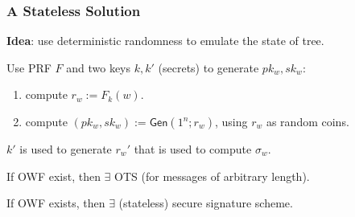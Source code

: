 \begin{comment}
\[ \Pr [\mathsf{Sigforge}_{\mathcal{A},\Pi }^{\text{1-time}}(n)=1] = \Pr [\mathsf{Sigforge}_{\mathcal{A}^*,\Pi^* }(n)=1]/\ell(n)\]
\end{proof}
\end{frame}
\end{comment}
\begin{frame}\frametitle{A Stateless Solution}
\textbf{Idea}: use deterministic randomness to emulate the state of tree.
\newline

Use PRF $F$ and two keys $k,k'$ (secrets) to generate $pk_w,sk_w$:
\begin{enumerate}
\item compute $r_w := F_k(w)$.
\item compute $(pk_w,sk_w) := \mathsf{Gen}(1^n;r_w)$, using $r_w$ as random coins.
\end{enumerate}
$k'$ is used to generate $r_w'$ that is used to compute $\sigma_w$.
\begin{lemma}
If OWF exist, then $\exists$ OTS (for messages of arbitrary length).
\end{lemma}
\begin{theorem}
If OWF exists, then $\exists$ (stateless) secure signature scheme.
\end{theorem}
\end{frame}

